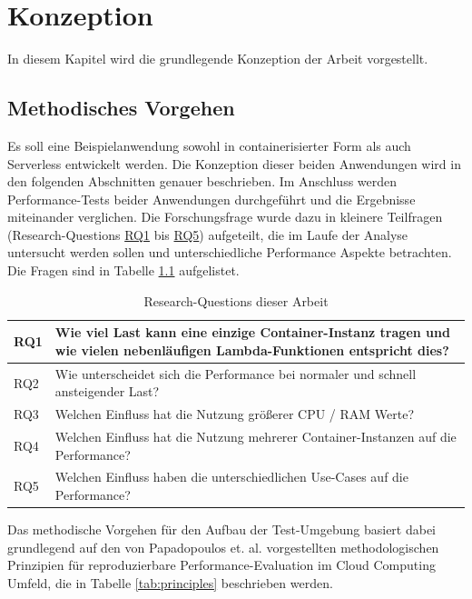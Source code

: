 \chapter{Konzeption}
\label{ch:konzeption}
In diesem Kapitel wird die grundlegende Konzeption der Arbeit vorgestellt.

\section{Methodisches Vorgehen}
Es soll eine Beispielanwendung sowohl in containerisierter Form als auch Serverless entwickelt werden. Die Konzeption dieser beiden Anwendungen wird in den folgenden Abschnitten genauer beschrieben. 
Im Anschluss werden Performance-Tests beider Anwendungen durchgeführt und die Ergebnisse miteinander verglichen. Die Forschungsfrage wurde dazu in kleinere Teilfragen (Research-Questions \hyperref[tab:research-questions]{RQ1} bis \hyperref[tab:research-questions]{RQ5}) aufgeteilt, die im Laufe der Analyse untersucht werden sollen und unterschiedliche Performance Aspekte betrachten. Die Fragen sind in Tabelle \ref{tab:research-questions} aufgelistet.

\begin{table}[H]
\begin{tabularx}{\textwidth}{|l|X|}
\hline
RQ1 & Wie viel Last kann eine einzige Container-Instanz tragen und wie vielen nebenläufigen Lambda-Funktionen entspricht dies? \\ \hline
RQ2 & Wie unterscheidet sich die Performance bei normaler und schnell ansteigender Last?                                                          \\ \hline
RQ3 & Welchen Einfluss hat die Nutzung größerer CPU / RAM Werte?                                                              \\ \hline
RQ4 & Welchen Einfluss hat die Nutzung mehrerer Container-Instanzen auf die Performance?                                      \\ \hline
RQ5 & Welchen Einfluss haben die unterschiedlichen Use-Cases auf die Performance?                                                  \\ \hline
\end{tabularx}
\caption{\label{tab:research-questions}Research-Questions dieser Arbeit}
\end{table}

Das methodische Vorgehen für den Aufbau der Test-Umgebung basiert dabei grundlegend auf den von Papadopoulos et. al. vorgestellten methodologischen Prinzipien für reproduzierbare Performance-Evaluation im Cloud Computing Umfeld, die in Tabelle \ref{tab:principles} beschrieben werden\cite{papadopoulos_methodological_2019}.

